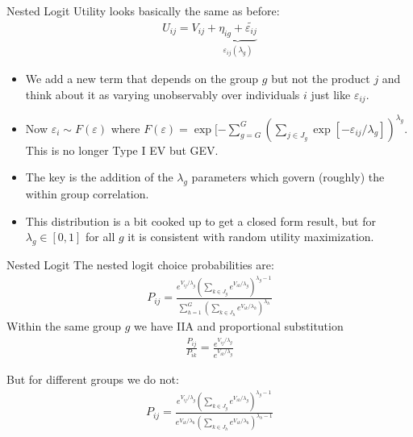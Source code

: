 \documentclass[xcolor=pdftex,dvipsnames,table,mathserif]{beamer}
\begin{document}
\begin{frame}{Nested Logit}
Utility looks basically the same as before:
\begin{eqnarray*}
U_{ij} = V_{ij} + \underbrace{\eta_{ig} + \widetilde{\varepsilon_{ij}}}_{\varepsilon_{ij}(\lambda_g)}
\end{eqnarray*}
\begin{itemize}
\item We add a new term that depends on the group $g$ but not the product $j$ and think about it as varying unobservably over individuals $i$ just like $\varepsilon_{ij}$.
\item Now $\varepsilon_i \sim F(\varepsilon)$ where $F(\varepsilon) = \exp[-\sum_{g=G}^G \left(\sum_{j \in J_g} \exp[-\varepsilon_{ij}/\lambda_g]\right)^{\lambda_g}$. This is no longer Type I EV but GEV.
\item The key is the addition of the $\lambda_g$ parameters which govern (roughly) the within group correlation.
\item This distribution is a bit cooked up to get a closed form result, but for $\lambda_g \in [0,1]$ for all $g$ it is consistent with random utility maximization.
\end{itemize}
\end{frame}

\begin{frame}{Nested Logit}
The nested logit choice probabilities are:
\begin{eqnarray*}
P_{ij} = \frac{ e^{V_{ij}/\lambda_g} \left(\sum_{k \in J_g} e^{V_{ik}/\lambda_g} \right)^{\lambda_g -1}}{\sum_{h=1}^G \left(\sum_{k \in J_h} e^{V_{ik}/\lambda_h} \right)^{\lambda_h}}
\end{eqnarray*}
Within the same group $g$ we have IIA and proportional substitution 
\begin{eqnarray*}
\frac{P_{ij}}{P_{ik}} = \frac{ e^{V_{ij}/\lambda_g}}{ e^{V_{ik}/\lambda_g}}
\end{eqnarray*}

But for different groups we do not:
\begin{eqnarray*}
P_{ij} = \frac{ e^{V_{ij}/\lambda_g} \left(\sum_{k \in J_g} e^{V_{ik}/\lambda_g} \right)^{\lambda_g -1}}{ e^{V_{ik}/\lambda_h} \left(\sum_{k \in J_h} e^{V_{ik}/\lambda_h} \right)^{\lambda_h -1}}
\end{eqnarray*}
\end{frame}
\end{document}
